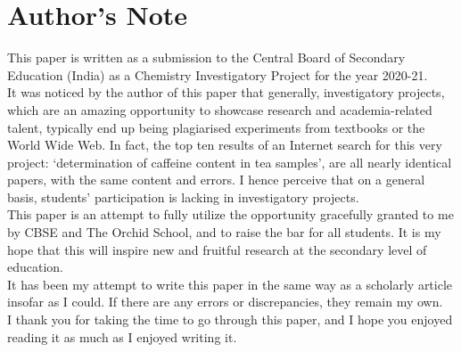 \documentclass[11pt]{article}
\begin{document}
\newpage

\section{Author's Note}

This paper is written as a submission to the Central Board of Secondary Education (India) as a
Chemistry Investigatory Project for the year 2020-21. \\
It was noticed by the author of this paper that generally, investigatory projects, which are an
amazing opportunity to showcase research and academia-related talent, typically end up being
plagiarised experiments from textbooks or the World Wide Web. In fact, the top ten results of
an Internet search for this very project: `determination of caffeine content in tea samples', are all
nearly identical papers, with the same content and errors. I hence perceive that on a general
basis, students' participation is lacking in investigatory projects.\\
This paper is an attempt to fully utilize the opportunity gracefully granted to me by CBSE and The
Orchid School, and to raise the bar for all students. It is my hope that this will inspire new and
fruitful research at the secondary level of education.\\
It has been my attempt to write this paper in the same way as a scholarly article insofar as I
could. If there are any errors or discrepancies, they remain my own.\\
I thank you for taking the time to go through this paper, and I hope you enjoyed reading it as much
as I enjoyed writing it.\\

\newpage

\renewcommand\refname{Bibliography}
\printbibliography
{}
\end{document}
